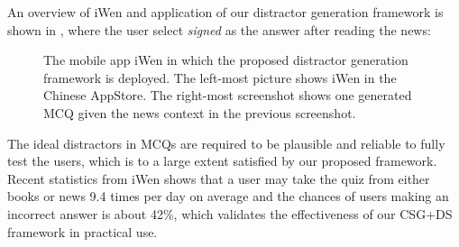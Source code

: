 An overview of iWen and application of our 
distractor generation framework is shown in , where the user 
select \textit{signed} as the answer after reading the news:
\begin{figure}[t!]
	 	\centering
 		\caption{The mobile app iWen in which the proposed distractor generation framework is 
deployed. The left-most picture shows iWen in the Chinese AppStore. 
The right-most screenshot shows one generated MCQ given the news context in 
the previous screenshot.}
 		\label{fig:app}
\end{figure}
The ideal distractors in MCQs are required to be plausible and reliable to fully test 
the users, which is to a large extent satisfied by our proposed framework. Recent statistics from iWen shows that a user may take the quiz from either books or news 9.4 times per day on average and the chances of users making an incorrect
answer is about 42\%, which validates the effectiveness of our CSG+DS 
framework in practical use.
